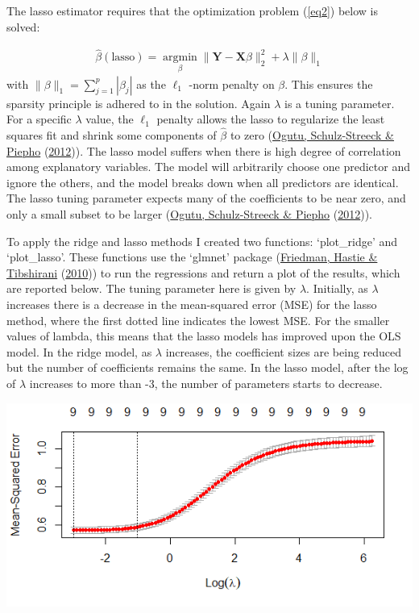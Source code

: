 \documentclass[11pt,preprint, authoryear]{elsarticle}
\let\origfigure\figure
\let\endorigfigure\endfigure
\renewenvironment{figure}[1][2] {
    \expandafter\origfigure\expandafter[H]
} {
    \endorigfigure
}
\numberwithin{equation}{section}
\numberwithin{figure}{section}
\numberwithin{table}{section}
\begin{document}
The lasso estimator requires that the optimization problem (\ref{eq2})
below is solved:

\begin{align}
\hat{\beta}(\text{lasso})=\underset{{\beta}}{\operatorname{argmin}}\|\mathbf{Y}-\mathbf{X} {\beta}\|_{2}^{2}+\lambda\|\beta\|_{1} \label{eq2}
\end{align} with \(\|\beta\|_{1}=\sum_{j=1}^{p}\left|\beta_{j}\right|\)
as the \(\ell_{1}\) -norm penalty on \(\beta\). This ensures the
sparsity principle is adhered to in the solution. Again \(\lambda\) is a
tuning parameter. For a specific \(\lambda\) value, the \(\ell_{1}\)
penalty allows the lasso to regularize the least squares fit and shrink
some components of \(\hat{\beta}\) to zero
(\protect\hyperlink{ref-lass}{Ogutu, Schulz-Streeck \& Piepho}
(\protect\hyperlink{ref-lass}{2012})). The lasso model suffers when
there is high degree of correlation among explanatory variables. The
model will arbitrarily choose one predictor and ignore the others, and
the model breaks down when all predictors are identical. The lasso
tuning parameter expects many of the coefficients to be near zero, and
only a small subset to be larger (\protect\hyperlink{ref-lass}{Ogutu,
Schulz-Streeck \& Piepho} (\protect\hyperlink{ref-lass}{2012})).

To apply the ridge and lasso methods I created two functions:
`plot\_ridge' and `plot\_lasso'. These functions use the `glmnet'
package (\protect\hyperlink{ref-glm}{Friedman, Hastie \& Tibshirani}
(\protect\hyperlink{ref-glm}{2010})) to run the regressions and return a
plot of the results, which are reported below. The tuning parameter here
is given by \(\lambda\). Initially, as \(\lambda\) increases there is a
decrease in the mean-squared error (MSE) for the lasso method, where the
first dotted line indicates the lowest MSE. For the smaller values of
lambda, this means that the lasso models has improved upon the OLS
model. In the ridge model, as \(\lambda\) increases, the coefficient
sizes are being reduced but the number of coefficients remains the same.
In the lasso model, after the log of \(\lambda\) increases to more than
-3, the number of parameters starts to decrease.

\begin{figure}
\centering
\includegraphics{"images/ridge.png"}
\caption{Ridge Model}
\end{figure}
\end{document}
